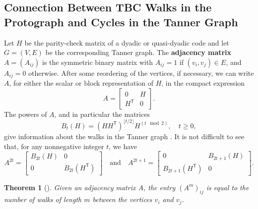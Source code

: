 \documentclass[11pt]{article}
\newtheorem{theorem}[lemma]{Theorem}
\theoremstyle{plain}
\theoremstyle{plain}
\theoremstyle{definition}
\numberwithin{theo}{section}
\def\matrix#1{\begin{bmatrix}#1\end{bmatrix}} %
\begin{document}
{

\subsection{Connection Between TBC Walks in the Protograph and Cycles in the Tanner Graph}
\label{sec:counting_cycles_dyadics_background}
 
Let $H$ be the parity-check matrix of a dyadic or quasi-dyadic code and let $G=(V,E)$ be the corresponding Tanner graph. The \textbf{adjacency matrix} $A=(A_{ij})$ is the symmetric binary matrix with $A_{ij}=1$ if $(v_i,v_j)\in E$, and $A_{ij}=0$ otherwise. After some reordering of the vertices, if necessary, we can write $A$, for either the scalar or block representation of $H$, in the compact expression
\begin{equation}
\label{counting_cycles_adjacencymatrix}
A=\matrix{0&H \\ H^{\mathsf{T}}&0}.
\end{equation}
The powers of $A$, and in particular the matrices
\begin{equation*}
\label{counting_cycles_BnH}
B_t(H)=\left(HH^\mathsf{T}\right)^{\lfloor{t/2}\rfloor}H^{(t\mod 2)}, \quad t\geq 0,
\end{equation*}
give information about the walks in the Tanner graph \cite{wyz08}. It is not difficult to see that, for any nonnegative integer $t$, we have 
\begin{equation}
\label{counting_cycles_adjacencymatrix_powers}
A^{2t} = \matrix{B_{2t}(H)&0 \\ 0&B_{2t}(H^\mathsf{T})} \quad\text{and}\quad A^{2t+1}=\matrix{0&B_{2t+1}(H) \\ B_{2t+1}(H^\mathsf{T})&0}.
\end{equation}

\begin{theorem}[]
\label{counting_cycles_powerofadjacencymatrix}
Given an adjacency matrix $A$, the entry ${(A^m)}_{ij}$ is equal to the number of walks of length $m$ between the vertices $v_i$ and $v_j$.
\end{theorem}

}
\end{document}
